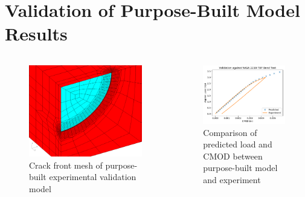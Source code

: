 \section{Validation of Purpose-Built Model Results}

\begin{frame}
\begin{columns}
\begin{column}{0.45\textwidth}
\begin{figure}[tbp]
\centering
\includegraphics[width=\columnwidth]{exp_validation_mesh_zoomed}
\caption{Crack front mesh of purpose-built experimental validation model}
\end{figure}
\end{column}
\begin{column}{0.45\textwidth}
\begin{figure}[tbp]
\centering
\includegraphics[width=\columnwidth]{experimental-validation-load-cmod}
\caption{Comparison of predicted load and CMOD between purpose-built model and experiment}
\end{figure}
\end{column}
\end{columns}
\note{
\vfill
}
\end{frame}

